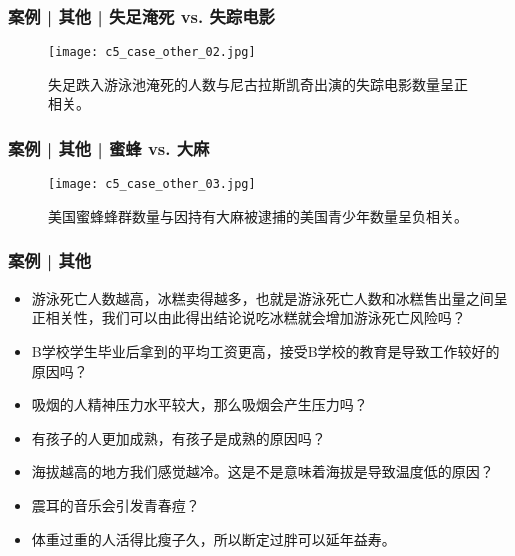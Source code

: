 \begin{frame}
  \frametitle{案例 | 其他 | 失足淹死 vs. 失踪电影}
  \begin{figure}
    \centering
    \texttt{[image: c5\_case\_other\_02.jpg]}
    \caption{失足跌入游泳池淹死的人数与尼古拉斯凯奇出演的失踪电影数量呈正相关。}
  \end{figure}
\end{frame}

\begin{frame}
  \frametitle{案例 | 其他 | 蜜蜂 vs. 大麻}
  \begin{figure}
    \centering
    \texttt{[image: c5\_case\_other\_03.jpg]}
    \caption{美国蜜蜂蜂群数量与因持有大麻被逮捕的美国青少年数量呈负相关。}
  \end{figure}
\end{frame}


\begin{frame}
  \frametitle{案例 | 其他}
  \begin{itemize}
    \item 游泳死亡人数越高，冰糕卖得越多，也就是游泳死亡人数和冰糕售出量之间呈正相关性，我们可以由此得出结论说吃冰糕就会增加游泳死亡风险吗？
    \item B学校学生毕业后拿到的平均工资更高，接受B学校的教育是导致工作较好的原因吗？
    \item 吸烟的人精神压力水平较大，那么吸烟会产生压力吗？
    \item 有孩子的人更加成熟，有孩子是成熟的原因吗？
    \item 海拔越高的地方我们感觉越冷。这是不是意味着海拔是导致温度低的原因？
    \item 震耳的音乐会引发青春痘？
    \item 体重过重的人活得比瘦子久，所以断定过胖可以延年益寿。
  \end{itemize}
\end{frame}

